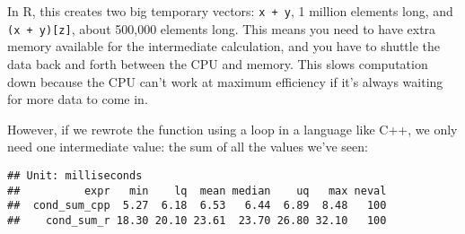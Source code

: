 In R, this creates two big temporary vectors: \texttt{x\ +\ y}, 1
million elements long, and \texttt{(x\ +\ y){[}z{]}}, about 500,000
elements long. This means you need to have extra memory available for
the intermediate calculation, and you have to shuttle the data back and
forth between the CPU and memory. This slows computation down because
the CPU can't work at maximum efficiency if it's always waiting for more
data to come in.

However, if we rewrote the function using a loop in a language like C++,
we only need one intermediate value: the sum of all the values we've
seen:

\begin{Shaded}
\begin{Highlighting}[]
 

  \NormalTok{;}

  \NormalTok{(}
    \NormalTok{;}
\NormalTok{  \}}

\NormalTok{\}}
\end{Highlighting}
\end{Shaded}

\begin{Shaded}
\begin{Highlighting}[]
\StringTok{ }
  \OperatorTok{+}\StringTok{ }
\NormalTok{\}}

\NormalTok{(}
   
   
   
\NormalTok{)}
\end{Highlighting}
\end{Shaded}

\begin{verbatim}
## Unit: milliseconds
##          expr   min    lq  mean median    uq   max neval
##  cond_sum_cpp  5.27  6.18  6.53   6.44  6.89  8.48   100
##    cond_sum_r 18.30 20.10 23.61  23.70 26.80 32.10   100
\end{verbatim}

